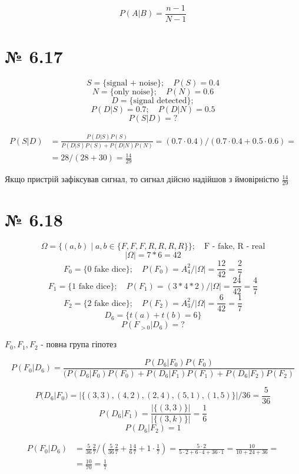 \documentclass[11pt, a4paper]{article} %
\begin{document}
\begin{mdframed}[style=ans]
    $$P(A|B) = \frac{n-1}{N-1}$$
\end{mdframed}

\section*{№ 6.17}

$$S = \{\text{signal + noise}\};\quad P(S) = 0.4$$
$$N = \{\text{only noise}\};\quad P(N) = 0.6$$
$$D = \{\text{signal detected}\};$$
$$P(D|S) = 0.7;\quad P(D|N) = 0.5$$
$$P(S|D) = ?$$

\begin{align*}
    P(S|D) &= \frac{P(D|S)P(S)}{P(D|S)P(S)+P(D|N)P(N)} = (0.7 \cdot 0.4) / (0.7 \cdot 0.4 + 0.5 \cdot 0.6) = \\
    &= 28 / (28+30) = \frac{14}{29}
\end{align*}

\begin{mdframed}[style=ans]
    Якщо пристрій зафіксував сигнал, то сигнал дійсно надійшов з ймовірністю $\frac{14}{29}$
\end{mdframed}

\section*{№ 6.18}
$$\Omega = \{(a,b)\;|\; a,b \in \{F,F,F,R,R,R,R\}\};\quad \text{F - fake, R - real}$$
$$|\Omega| = 7*6 = 42$$
$$F_0 = \{\text{0 fake dice}\};\quad P(F_0) = A_4^2 / |\Omega| = \frac{12}{42} = \frac{2}{7}$$
$$F_1 = \{\text{1 fake dice}\};\quad P(F_1) = (3*4*2) / |\Omega| = \frac{24}{42} = \frac{4}{7}$$
$$F_2 = \{\text{2 fake dice}\};\quad P(F_2) = A_3^2 / |\Omega| = \frac{6}{42} = \frac{1}{7}$$
$$D_6 = \{t(a)+t(b)=6\}$$
$$P(F_{>0} | D_6) = ?$$

$F_0, F_1, F_2$ - повна група гіпотез

$$P(F_0 | D_6) = \frac{P(D_6 | F_0) P(F_0)}{(P(D_6|F_0)P(F_0) + P(D_6|F_1)P(F_1) + P(D_6|F_2)P(F_2)}$$

\begin{mdframed}
    $$P(D_6 | F_0) = |\{(3,3), (4,2), (2,4), (5,1), (1,5)\}|/36 = \frac{5}{36}$$
    $$P(D_6 | F_1) = \frac{|\{(3,3)\}|}{|\{(3,k)\}|} = \frac{1}{6}$$
    $$P(D_6 | F_2) = 1$$
\end{mdframed}

\begin{align*}
    P(F_0 | D_6) &= \frac{5}{36} \frac{2}{7} / (\frac{5}{36}\frac{2}{7} + \frac{1}{6}\frac{4}{7} + 1 \cdot \frac{1}{7}) 
    = \frac{5\cdot 2}{5\cdot 2+ 6\cdot 4+36\cdot 1} = \frac{10}{10+24+36} =\\
    &= \frac{10}{70} = \frac{1}{7}
\end{align*}
\end{document}

